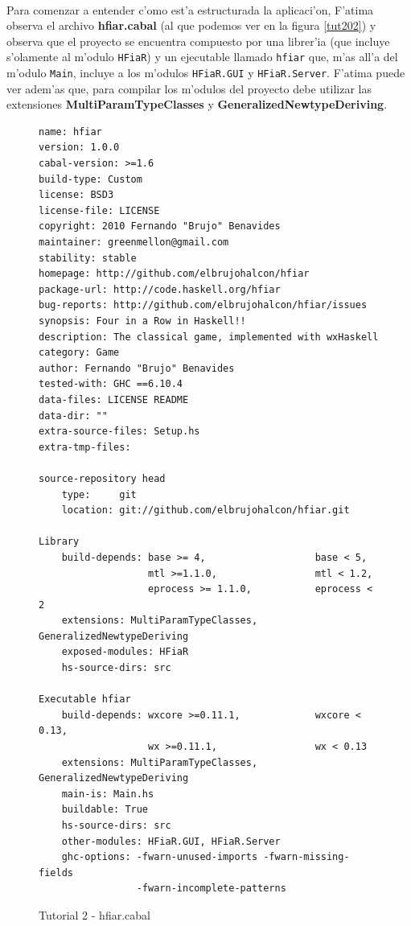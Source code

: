 \documentclass[a4paper]{article}
\begin{document}
\paragraph{}Para comenzar a entender c'omo est'a estructurada la aplicaci'on, F'atima observa el archivo \textbf{hfiar.cabal} (al que podemos ver en la figura \ref{tut202}) y observa que el proyecto se encuentra compuesto por una librer'ia (que incluye s'olamente al m'odulo \texttt{HFiaR}) y un ejecutable llamado \texttt{hfiar} que, m'as all'a del m'odulo \texttt{Main}, incluye a los m'odulos \texttt{HFiaR.GUI} y \texttt{HFiaR.Server}.  F'atima puede ver adem'as que, para compilar los m'odulos del proyecto debe utilizar las extensiones \textbf{MultiParamTypeClasses} y \textbf{GeneralizedNewtypeDeriving}.
\begin{figure}[hp]
	\begin{center}
	\hbox{}
		\begin{center}\begin{lstlisting}
name: hfiar
version: 1.0.0
cabal-version: >=1.6
build-type: Custom
license: BSD3
license-file: LICENSE
copyright: 2010 Fernando "Brujo" Benavides
maintainer: greenmellon@gmail.com
stability: stable
homepage: http://github.com/elbrujohalcon/hfiar
package-url: http://code.haskell.org/hfiar
bug-reports: http://github.com/elbrujohalcon/hfiar/issues
synopsis: Four in a Row in Haskell!!
description: The classical game, implemented with wxHaskell
category: Game
author: Fernando "Brujo" Benavides
tested-with: GHC ==6.10.4
data-files: LICENSE README
data-dir: ""
extra-source-files: Setup.hs
extra-tmp-files:

source-repository head
    type:     git
    location: git://github.com/elbrujohalcon/hfiar.git

Library
    build-depends: base >= 4,                   base < 5,
                   mtl >=1.1.0,                 mtl < 1.2,
                   eprocess >= 1.1.0,           eprocess < 2
    extensions: MultiParamTypeClasses, GeneralizedNewtypeDeriving
    exposed-modules: HFiaR
    hs-source-dirs: src

Executable hfiar
    build-depends: wxcore >=0.11.1,             wxcore < 0.13,
                   wx >=0.11.1,                 wx < 0.13
    extensions: MultiParamTypeClasses, GeneralizedNewtypeDeriving
    main-is: Main.hs
    buildable: True
    hs-source-dirs: src
    other-modules: HFiaR.GUI, HFiaR.Server
    ghc-options: -fwarn-unused-imports -fwarn-missing-fields
                 -fwarn-incomplete-patterns
		\end{lstlisting}\end{center}
		\caption{Tutorial 2 - hfiar.cabal}
		\label{tut201}
	\end{center}
\end{figure}
\end{document}
